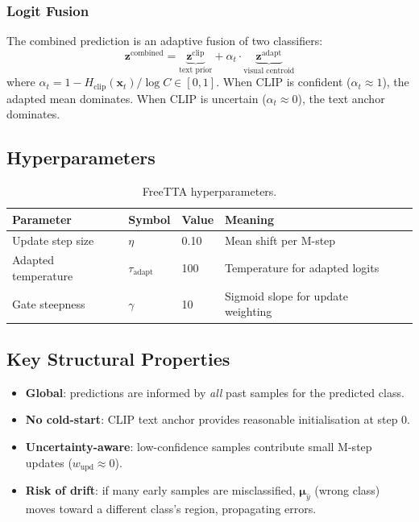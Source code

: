 \documentclass[12pt,a4paper]{article}
\newcommand{\bx}{\mathbf{x}}
\newcommand{\bmu}{\boldsymbol{\mu}}
\newcommand{\1}{\mathbf{1}}
\begin{document}
\subsubsection{Logit Fusion}

The combined prediction is an adaptive fusion of two classifiers:
\begin{equation}
  \mathbf{z}^{\text{combined}} = \underbrace{\mathbf{z}^{\text{clip}}}_{\text{text prior}} + \alpha_t \cdot \underbrace{\mathbf{z}^{\text{adapt}}}_{\text{visual centroid}}
\end{equation}
where $\alpha_t = 1 - H_{\text{clip}}(\bx_t)/\log C \in [0,1]$.
When CLIP is confident ($\alpha_t \approx 1$), the adapted mean dominates.
When CLIP is uncertain ($\alpha_t \approx 0$), the text anchor dominates.

\subsection{Hyperparameters}

\begin{table}[H]
\centering
\caption{FreeTTA hyperparameters.}
\label{tab:freetta_hyperparams}
\begin{tabular}{@{}lllll@{}}
\toprule
Parameter & Symbol & Value & Meaning \\
\midrule
Update step size   & $\eta$          & 0.10  & Mean shift per M-step \\
Adapted temperature & $\tau_{\text{adapt}}$ & 100 & Temperature for adapted logits \\
Gate steepness     & $\gamma$        & 10    & Sigmoid slope for update weighting \\
\bottomrule
\end{tabular}
\end{table}

\subsection{Key Structural Properties}

\begin{itemize}
  \item \textbf{Global}: predictions are informed by \emph{all} past samples for the predicted class.
  \item \textbf{No cold-start}: CLIP text anchor provides reasonable initialisation at step 0.
  \item \textbf{Uncertainty-aware}: low-confidence samples contribute small M-step updates ($w_{\text{upd}} \approx 0$).
  \item \textbf{Risk of drift}: if many early samples are misclassified, $\bmu_{\hat{y}}$ (wrong class) moves toward a different class's region, propagating errors.
\end{itemize}
\end{document}
